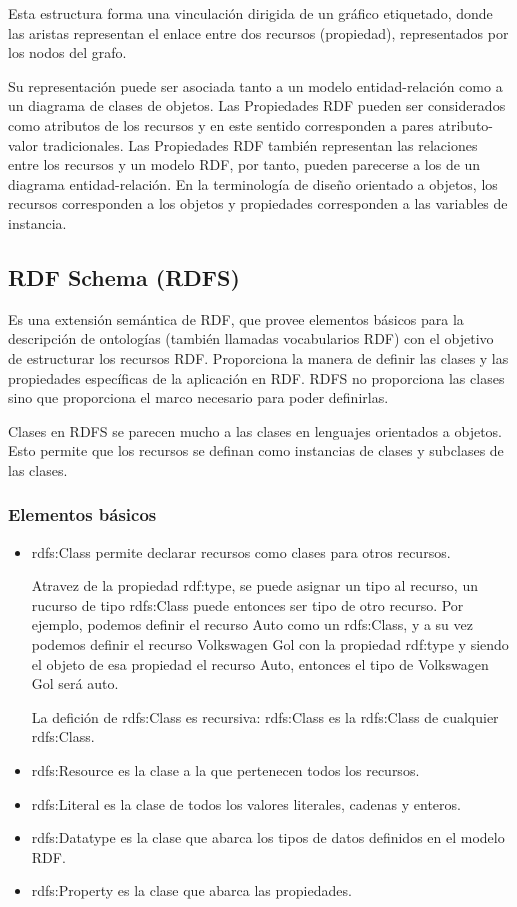 Esta estructura forma una vinculación dirigida de un gráfico etiquetado, donde las aristas representan el enlace entre dos 
recursos (propiedad), representados por los nodos del grafo.

Su representación puede ser asociada tanto a un modelo entidad-relación como a un diagrama de clases de objetos.
Las Propiedades RDF pueden ser considerados como atributos de los recursos y en este sentido corresponden a pares 
atributo-valor tradicionales. Las Propiedades RDF también representan las relaciones entre los recursos y un modelo RDF,
por tanto, pueden parecerse a los de un diagrama entidad-relación.
En la terminología de diseño orientado a objetos, los recursos corresponden a los objetos y propiedades 
corresponden a las variables de instancia.

\subsection{RDF Schema (RDFS)}

Es una extensión semántica de RDF, que provee elementos básicos para la descripción de ontologías (también llamadas vocabularios RDF) con el objetivo
de estructurar los recursos RDF. Proporciona la manera de definir las clases y las propiedades específicas de la aplicación en RDF.
RDFS no proporciona las clases sino que proporciona el marco necesario para poder definirlas.

Clases en RDFS se parecen mucho a las clases en lenguajes orientados a objetos. Esto permite que los recursos se definan como 
instancias de clases y subclases de las clases.

\subsubsection{Elementos básicos}

\begin{itemize}
  \item 
    rdfs:Class permite declarar recursos como clases para otros recursos. 
    
    Atravez de la propiedad rdf:type, se puede asignar un tipo al recurso, un rucurso de tipo rdfs:Class puede entonces ser tipo de otro recurso. 
    Por ejemplo, podemos definir el recurso Auto como un rdfs:Class, y a su vez podemos definir el recurso Volkswagen Gol con la propiedad rdf:type 
    y siendo el objeto de esa propiedad el recurso Auto, entonces el tipo de Volkswagen Gol será auto.
    
    La defición de rdfs:Class es recursiva: rdfs:Class es la rdfs:Class de cualquier rdfs:Class.
  \item
    rdfs:Resource es la clase a la que pertenecen todos los recursos.
  \item
    rdfs:Literal es la clase de todos los valores literales, cadenas y enteros.
  \item
    rdfs:Datatype es la clase que abarca los tipos de datos definidos en el modelo RDF.
  \item
    rdfs:Property es la clase que abarca las propiedades.
\end{itemize}

